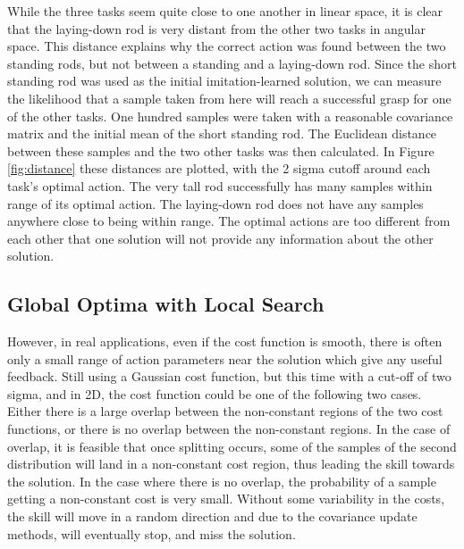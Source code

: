 \documentclass[12pt]{article}
\begin{document}
\newpage
While the three tasks seem quite close to one another in linear space, it is clear that the laying-down rod is very distant from the other two tasks in angular space. This distance explains why the correct action was found between the two standing rods, but not between a standing and a laying-down rod. Since the short standing rod was used as the initial imitation-learned solution, we can measure the likelihood that a sample taken from here will reach a successful grasp for one of the other tasks. One hundred samples were taken with a reasonable covariance matrix and the initial mean of the short standing rod. The Euclidean distance between these samples and the two other tasks was then calculated. In Figure \ref{fig:distance} these distances are plotted, with the 2 sigma cutoff around each task's optimal action. The very tall rod successfully has many samples within range of its optimal action. The laying-down rod does not have any samples anywhere close to being within range. The optimal actions are too different from each other that one solution will not provide any information about the other solution.

\subsection{Global Optima with Local Search}

However, in real applications, even if the cost function is smooth, there is often only a small range of action parameters near the solution which give any useful feedback. Still using a Gaussian cost function, but this time with a cut-off of two sigma, and in 2D, the cost function could be one of the following two cases. Either there is a large overlap between the non-constant regions of the two cost functions, or there is no overlap between the non-constant regions. In the case of overlap, it is feasible that once splitting occurs, some of the samples of the second distribution will land in a non-constant cost region, thus leading the skill towards the solution. In the case where there is no overlap, the probability of a sample getting a non-constant cost is very small. Without some variability in the costs, the skill will move in a random direction and due to the covariance update methods, will eventually stop, and miss the solution.
 
\end{document}
